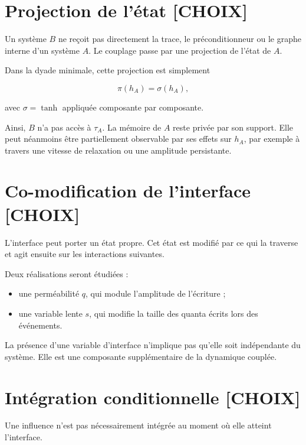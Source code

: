 \section{Projection de l'état {[}CHOIX{]}}\label{t2-projection-de-letat-choix}

Un système \(B\) ne reçoit pas directement la trace, le préconditionneur
ou le graphe interne d'un système \(A\). Le couplage passe par une
projection de l'état de \(A\).

Dans la dyade minimale, cette projection est simplement

\[
\pi(h_A)=\sigma(h_A),
\]

avec \(\sigma=\tanh\) appliquée composante par composante.

Ainsi, \(B\) n'a pas accès à \(\tau_A\). La mémoire de \(A\) reste
privée par son support. Elle peut néanmoins être partiellement
observable par ses effets sur \(h_A\), par exemple à travers une vitesse
de relaxation ou une amplitude persistante.

\section{Co-modification de l'interface {[}CHOIX{]}}\label{t2-co-modification-de-linterface-choix}

L'interface peut porter un état propre. Cet état est modifié par ce qui
la traverse et agit ensuite sur les interactions suivantes.

Deux réalisations seront étudiées :

\begin{itemize}
\tightlist
\item
  une perméabilité \(q\), qui module l'amplitude de l'écriture ;
\item
  une variable lente \(s\), qui modifie la taille des quanta écrits lors
  des événements.
\end{itemize}

La présence d'une variable d'interface n'implique pas qu'elle soit
indépendante du système. Elle est une composante supplémentaire de la
dynamique couplée.

\section{Intégration conditionnelle {[}CHOIX{]}}\label{t2-integration-conditionnelle-choix}

Une influence n'est pas nécessairement intégrée au moment où elle
atteint l'interface.

